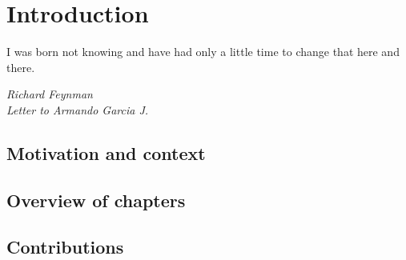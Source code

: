 \chapter[Introduction]{Introduction}

\epigraph{I was born not knowing and have had only a little time to change that here and there.}
{\textit{ Richard Feynman \\ Letter to Armando Garcia J.}}


\minitoc

\section{Motivation and context}


\section{Overview of chapters}


\section{Contributions}